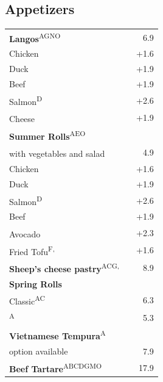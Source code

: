 \documentclass[a4paper,12pt]{article}
\newcommand{\vegan}{\textbf{\scriptsize \color{vegan}{Vegan}}}
\newcommand{\vegetarisch}{\textbf{\scriptsize \color{vegan}{Veg}}}
\begin{document}
\begin{multicols}{2}
\section*{Appetizers}
\begin{tabular}{Lrr}
\textbf{Langos}\textsuperscript{{\scriptsize AGNO}} & & 6.9\\
\hspace{0.4cm}Chicken & & +1.6\\
\hspace{0.4cm}Duck & & +1.9\\
\hspace{0.4cm}Beef & & +1.9\\
\hspace{0.4cm}Salmon\textsuperscript{{\scriptsize D}} & & +2.6\\
\hspace{0.4cm}Cheese\textsuperscript{\vegetarisch} & & +1.9\vspace{0.1cm}\\
\textbf{Summer Rolls}\textsuperscript{{\scriptsize AEO}}\\
\hspace{0.4cm}with vegetables and salad\textsuperscript{{\scriptsize \vegan}} & & 4.9\\
\hspace{0.4cm}Chicken & & +1.6\\
\hspace{0.4cm}Duck & & +1.9\\
\hspace{0.4cm}Salmon\textsuperscript{{\scriptsize D}} & & +2.6\\
\hspace{0.4cm}Beef & & +1.9\\
\hspace{0.4cm}Avocado\textsuperscript{{\scriptsize \vegan}} & & +2.3\\
\hspace{0.4cm}Fried Tofu\textsuperscript{{\scriptsize F, \vegan}} & & +1.6\vspace{0.1cm}\\
\textbf{Sheep's cheese pastry}\textsuperscript{{\scriptsize ACG, \vegetarisch}} & & 8.9\vspace{0.1cm}\\
\textbf{Spring Rolls}\\
\hspace{0.4cm}Classic\textsuperscript{{\scriptsize AC}} & & 6.3\\
\textsuperscript{{\scriptsize A}} & & 5.3\vspace{0.1cm}\\
\textbf{Vietnamese Tempura}\textsuperscript{{\scriptsize A}}\\
\hspace{0.4cm}\scriptsize {} option available & & 7.9\\
\textbf{Beef Tartare}\textsuperscript{{\scriptsize ABCDGMO}} & & 17.9\vspace{0.1cm}
\end{tabular}


\end{multicols}
\end{document}

